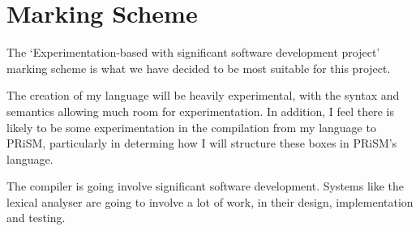 \documentclass[11pt, a4paper]{article}
\begin{document}

\section{Marking Scheme} %
\label{sec:marking_scheme}
The `Experimentation-based with significant software development project'
marking scheme is what we have decided to be most suitable for this project.

The creation of my language will be heavily experimental, with the syntax and
semantics allowing much room for experimentation. In addition, I feel there is
likely to be some experimentation in the compilation from my language to PRiSM,
particularly in determing how I will structure these boxes in PRiSM's language.

The compiler is going involve significant software development. Systems like the
lexical analyser are going to involve a lot of work, in their design,
implementation and testing.




\end{document}
